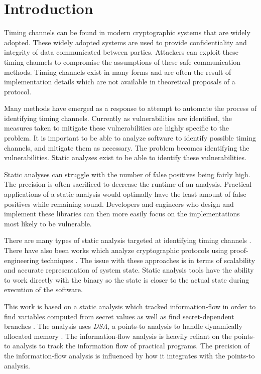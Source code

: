 \chapter{Introduction}
Timing channels can be found in modern cryptographic systems that are widely
adopted\cite{kochertiming,brumley2005remote,percival2005cache,bernstein2017sliding}.
These widely adopted systems are used to provide confidentiality and integrity
of data communicated between parties. Attackers can exploit these timing
channels to compromise the assumptions of these safe communication methods.
Timing channels exist in many forms and are often the result of implementation
details which are not available in theoretical proposals of a protocol.

  Many methods have emerged as a response to attempt to automate the process of
  identifying timing channels. Currently as vulnerabilities are
  identified, the measures taken to mitigate these vulnerabilities are highly
  specific to the problem. It is important to be able to analyze software to
  identify possible timing channels, and mitigate them as necessary. The problem
  becomes identifying the vulnerabilities. Static analyses exist to be able to
  identify these vulnerabilities.
  
  Static analyses can struggle with the number of false positives being fairly
  high. The precision is often sacrificed to decrease the runtime of an
  analysis. Practical applications of a static analysis would optimally have the
  least amount of false positives while remaining sound. Developers and
  engineers who design and implement these libraries can then more easily focus
  on the implementations most likely to be vulnerable.
  
  There are many types of static analysis targeted at identifying timing
  channels \cite{cached-zhang, brotzmancasym, molnar2005program}. There have also been
  works which analyze cryptographic protocols using proof-engineering techniques
  \cite{proof-engineering}. The issue with these approaches is in terms of
  scalability and accurate representation of system state. Static analysis tools
  have the ability to work directly with the binary so the state is closer to
  the actual state during execution of the software.

  This work is based on a static analysis which tracked information-flow in
  order to find variables computed from secret values as well as find
  secret-dependent branches \cite{moore2011static}. The analysis uses
  \textit{DSA}, a points-to analysis to handle dynamically allocated memory
  \cite{DSA-lattner}. The information-flow analysis is heavily reliant on the
  points-to analysis to track the information flow of practical programs. The
  precision of the information-flow analysis is influenced by how it integrates
  with the points-to analysis.
  
